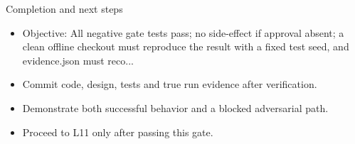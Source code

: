 \documentclass[aspectratio=169,10pt]{beamer}
\begin{document}
\begin{frame}{Completion and next steps}
\small
\begin{itemize}
\item Objective: All negative gate tests pass; no side-effect if approval absent; a clean offline checkout must reproduce the result with a fixed test seed, and evidence.json must reco...
\item Commit code, design, tests and true run evidence after verification.
\item Demonstrate both successful behavior and a blocked adversarial path.
\item Proceed to L11 only after passing this gate.
\end{itemize}

\end{frame}
\end{document}
